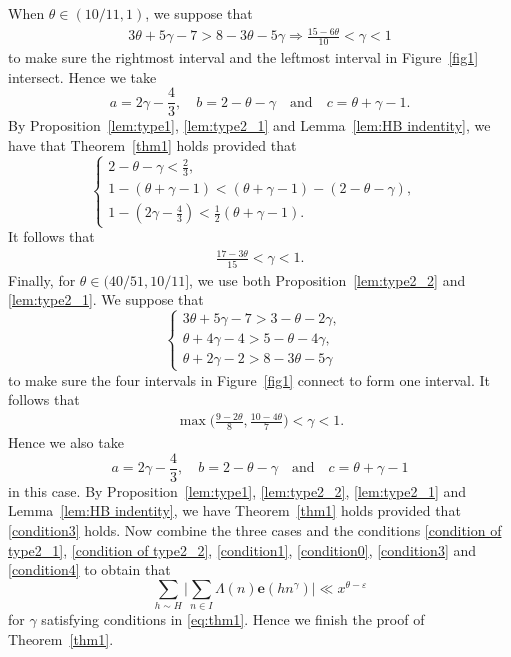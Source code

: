 \documentclass[12pt, reqno, twoside, letterpaper]{amsart}
\numberwithin{equation}{section}
\newcommand{\e}{\ensuremath{\mathbf{e}}}
\theoremstyle{customthm}
\theoremstyle{customrem}
\begin{document}
When $\theta \in (10/11,1)$, we suppose that
\begin{align} \label{condition0}
3\theta+5\gamma-7 > 8-3\theta-5\gamma \Rightarrow \frac{15-6\theta}{10} < \gamma < 1
\end{align}
to make sure the rightmost interval and the leftmost interval in Figure~\ref{fig1} intersect. Hence we take
$$
a = 2\gamma-\frac{4}{3}, \quad b=2-\theta-\gamma \quad \text{and}\quad c=\theta +\gamma-1. 
$$
By Proposition~\ref{lem:type1}, \ref{lem:type2_1} and Lemma~\ref{lem:HB indentity}, we have that Theorem~\ref{thm1} holds provided that
\begin{equation*}\label{condition2}
	\left\{\begin{array}{ll}
		2-\theta-\gamma < \frac{2}{3}, & \\
		1 - (\theta +\gamma-1) < (\theta +\gamma-1) - (2-\theta-\gamma), & \\
		1 - (2\gamma-\frac{4}{3}) < \frac{1}{2} (\theta +\gamma-1). &
	\end{array}\right.
\end{equation*}
It follows that
\begin{align}\label{condition3}
\frac{17-3\theta}{15} < \gamma < 1.
\end{align}
Finally, for $\theta \in (40/51,10/11]$, we use both Proposition~\ref{lem:type2_2} and \ref{lem:type2_1}. We suppose that
$$
\left\{\begin{array}{ll}
	3\theta+5\gamma-7 > 3-\theta-2\gamma, & \\
	\theta+4\gamma-4 > 5-\theta-4\gamma, & \\
	\theta+2\gamma-2 > 8-3\theta-5\gamma &
\end{array}\right.
$$
to make sure the four intervals in Figure~\ref{fig1} connect to form one interval. It follows that
\begin{align}\label{condition4}
\max \Big( \frac{9-2\theta}{8} , \frac{10-4\theta}{7} \Big) < \gamma <1.
\end{align}
Hence we also take
$$
a = 2\gamma-\frac{4}{3}, \quad b=2-\theta-\gamma \quad \text{and}\quad c=\theta +\gamma-1 
$$
in this case. By Proposition~\ref{lem:type1}, \ref{lem:type2_2}, \ref{lem:type2_1} and Lemma~\ref{lem:HB indentity}, we have Theorem~\ref{thm1} holds provided that \eqref{condition3} holds. Now combine the three cases and the conditions \eqref{condition of type2_1}, \eqref{condition of type2_2}, \eqref{condition1}, \eqref{condition0}, \eqref{condition3} and \eqref{condition4} to obtain that
$$
\sum_{h \sim H} \Big| \sum_{n\in I} \Lambda(n) \e(hn^\gamma) \Big| \ll x^{\theta-\varepsilon}
$$ 
for $\gamma$ satisfying conditions in \eqref{eq:thm1}. Hence we finish the proof of Theorem~\ref{thm1}.
\end{document}
